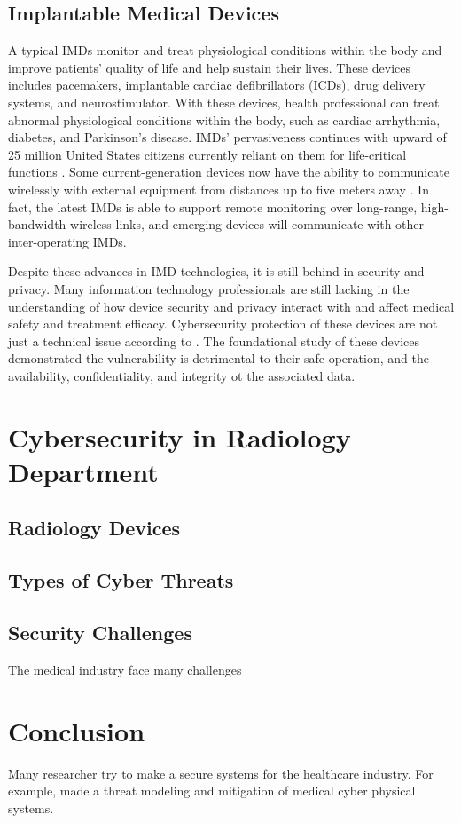 \documentclass{IEEEtran}
\begin{document}
\subsection{Implantable Medical Devices}
A typical IMDs monitor and treat physiological conditions within the body and improve patients' quality of life and help sustain their lives.  These devices includes pacemakers, implantable cardiac defibrillators (ICDs), drug delivery systems, and neurostimulator. With these devices, health professional can treat abnormal physiological conditions within the body, such as cardiac arrhythmia, diabetes, and Parkinson's disease. IMDs' pervasiveness continues with upward of 25 million United States citizens currently reliant on them for life-critical functions \cite{halperin2008security}. Some current-generation devices now have the ability to communicate wirelessly with external equipment from distances up to five meters away \cite{denning2010patients}. In fact, the latest IMDs is able to support remote monitoring over long-range, high-bandwidth wireless links, and emerging devices will communicate with other inter-operating IMDs. \par
Despite these advances in IMD technologies, it is still behind in security and privacy. Many information technology professionals are still lacking in the understanding of how device security and privacy interact with and affect medical safety and treatment efficacy. Cybersecurity protection of these devices are not just a technical issue according to \cite{williams2015cybersecurity}. The foundational study of these devices demonstrated the vulnerability is detrimental to their safe operation, and the availability, confidentiality, and integrity ot the associated data. 

\section{Cybersecurity in Radiology Department}
\subsection{Radiology Devices}
\subsection{Types of Cyber Threats}
\subsection{Security Challenges}
The medical industry face many challenges 

\section{Conclusion}
Many researcher try to make a secure systems for the healthcare industry. For example, \cite{Almohri:2017:TMM:3204094.3204113} made a threat modeling and mitigation of medical cyber physical systems. 





\end{document}
